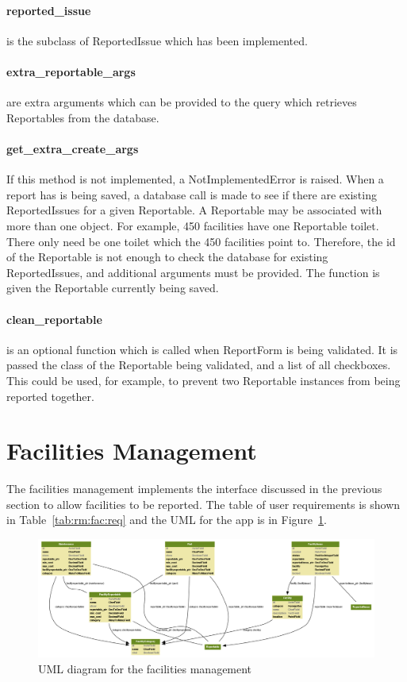 \paragraph{reported\_issue} is the subclass of ReportedIssue which has been implemented.

\paragraph{extra\_reportable\_args} are extra arguments which can be provided to the query which retrieves Reportables from the database.

\paragraph{get\_extra\_create\_args} If this method is not implemented, a NotImplementedError is raised. When a report has is being saved, a database call is made to see if there are existing ReportedIssues for a given Reportable. A Reportable may be associated with more than one object. For example, 450 facilities have one Reportable toilet. There only need be one toilet which the 450 facilities point to. Therefore, the id of the Reportable is not enough to check the database for existing ReportedIssues, and additional arguments must be provided. The function is given the Reportable currently being saved.

\paragraph{clean\_reportable} is an optional function which is called when ReportForm is being validated. It is passed the class of the Reportable being validated, and a list of all checkboxes. This could be used, for example, to prevent two Reportable instances from being reported together.

\section{Facilities Management}
The facilities management implements the interface discussed in the previous section to allow facilities to be reported. The table of user requirements is shown in Table~\ref{tab:rm:fac:req} and the UML for the app is in Figure~\ref{fig:rm:fac:uml}.

\begin{figure}[thp]
\centering
\includegraphics[scale=0.35,angle=90]{img/facilities.png}
\caption{UML diagram for the facilities management}
\label{fig:rm:fac:uml}
\end{figure}

